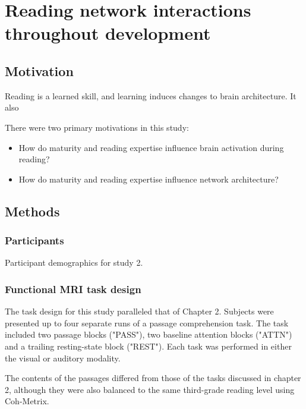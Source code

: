 \chapter{Reading network interactions throughout development}

\epigraph{}{}

\section{Motivation}

Reading is a learned skill, and learning induces changes to brain architecture. It also 

There were two primary motivations in this study:

\begin{itemize}
	\item How do maturity and reading expertise influence brain activation during reading?
	\item How do maturity and reading expertise influence network architecture?
\end{itemize} 

\section{Methods}

\subsection{Participants}

\begin{table}
	\scriptsize
	\renewcommand{\tabcolsep}{0.09cm}
	\centering
	
	\caption{Participant demographics for study 2.}
	\label{table:ch3-participants}
\end{table}

\subsection{Functional MRI task design}

The task design for this study paralleled that of Chapter 2. Subjects were presented up to four separate runs of a passage comprehension task. The task included two passage blocks ("PASS"), two baseline attention blocks ("ATTN") and a trailing resting-state block ("REST"). Each task was performed in either the visual or auditory modality.

The contents of the passages differed from those of the tasks discussed in chapter 2, although they were also balanced to the same third-grade reading level using Coh-Metrix. 

